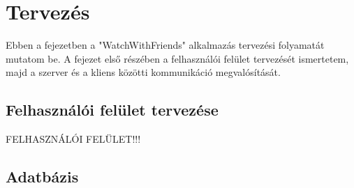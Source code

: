 \chapter{Tervez\'es}\label{chapter:tervezes}
Ebben a fejezetben a "WatchWithFriends" alkalmazás tervezési folyamatát mutatom be.
A fejezet első részében a felhasználói felület tervezését ismertetem,
majd a szerver és a kliens közötti kommunikáció megvalósítását.

\section*{Felhasználói felület tervezése}
FELHASZNÁLÓI FELÜLET!!!

\section*{Adatbázis}

